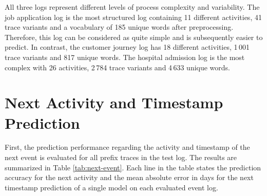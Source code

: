All three logs represent different levels of process complexity and variability.
The job application log is the most structured log containing 11 different activities, 41 trace variants and a vocabulary of 185 unique words after preprocessing.
Therefore, this log can be considered as quite simple and is subsequently easier to predict.
In contrast, the customer journey log has 18 different activities, 1\,001 trace variants and 817 unique words.
The hospital admission log is the most complex with 26 activities, 2\,784 trace variants and 4\,633 unique words.

\section{Next Activity and Timestamp Prediction}

First, the prediction performance regarding the activity and timestamp of the next event is evaluated for all prefix traces in the test log.
The results are summarized in Table \ref{tab:next-event}.
Each line in the table states the prediction accuracy for the next activity and the mean absolute error in days for the next timestamp prediction of a single model on each evaluated event log.

